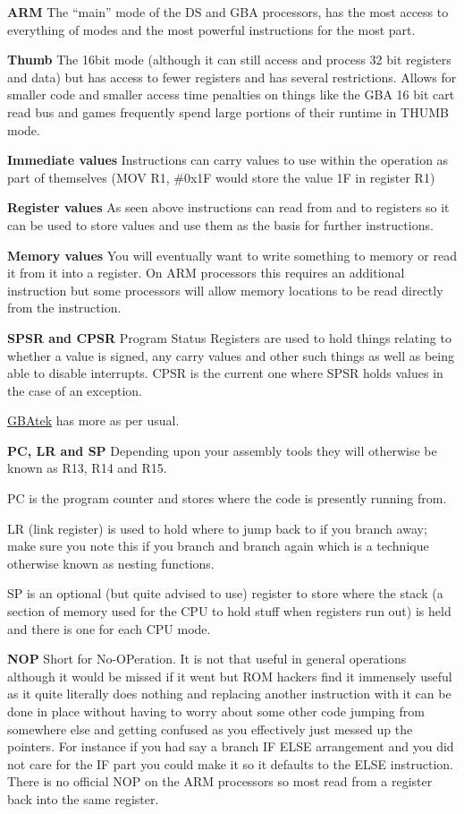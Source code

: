 \documentclass[
]{book}
\begin{document}
\textbf{ARM} The ``main'' mode of the DS and GBA processors, has the most access to everything of modes and the most powerful instructions for the most part.

\textbf{Thumb} The 16bit mode (although it can still access and process 32 bit registers and data) but has access to fewer registers and has several restrictions. Allows for smaller code and smaller access time penalties on things like the GBA 16 bit cart read bus and games frequently spend large portions of their runtime in THUMB mode.

\textbf{Immediate values} Instructions can carry values to use within the operation as part of themselves (MOV R1, \#0x1F would store the value 1F in register R1)

\textbf{Register values} As seen above instructions can read from and to registers so it can be used to store values and use them as the basis for further instructions.

\textbf{Memory values} You will eventually want to write something to memory or read it from it into a register. On ARM processors this requires an additional instruction but some processors will allow memory locations to be read directly from the instruction.

\textbf{SPSR and CPSR} Program Status Registers are used to hold things relating to whether a value is signed, any carry values and other such things as well as being able to disable interrupts. CPSR is the current one where SPSR holds values in the case of an exception.

\href{http://problemkaputt.de/gbatek.htm\#cpuflags}{GBAtek} has more as per usual.

\textbf{PC, LR and SP} Depending upon your assembly tools they will otherwise be known as R13, R14 and R15.

PC is the program counter and stores where the code is presently running from.

LR (link register) is used to hold where to jump back to if you branch away; make sure you note this if you branch and branch again which is a technique otherwise known as nesting functions.

SP is an optional (but quite advised to use) register to store where the stack (a section of memory used for the CPU to hold stuff when registers run out) is held and there is one for each CPU mode.

\textbf{NOP} Short for No-OPeration. It is not that useful in general operations although it would be missed if it went but ROM hackers find it immensely useful as it quite literally does nothing and replacing another instruction with it can be done in place without having to worry about some other code jumping from somewhere else and getting confused as you effectively just messed up the pointers. For instance if you had say a branch IF ELSE arrangement and you did not care for the IF part you could make it so it defaults to the ELSE instruction. There is no official NOP on the ARM processors so most read from a register back into the same register.
\end{document}
